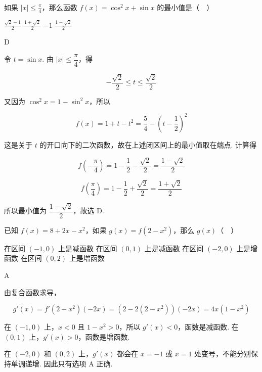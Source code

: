 \begin{problem}
如果 \(|x| \leqslant \frac{\pi}{4}\)，那么函数 \(f(x) = \cos^2 x + \sin x\) 的最小值是（\(\quad\)）

\choices
    {\(\frac{\sqrt{2} - 1}{2}\)}
    {\(\frac{1 + \sqrt{2}}{2}\)}
    {\(-1\)}
    {\(\frac{1 - \sqrt{2}}{2}\)}
\end{problem}

\begin{answer}
D
\end{answer}

\begin{solution}
令 \(t=\sin x\). 由 \(|x|\leqslant\dfrac\pi4\)，得

\[-\frac{\sqrt2}{2}\leqslant t\leqslant\frac{\sqrt2}{2}\]

又因为 \(\cos^2x=1-\sin^2x\)，所以

\[f(x)=1+t-t^2=\frac54-\left(t-\frac12\right)^2\]

这是关于 \(t\) 的开口向下的二次函数，故在上述闭区间上的最小值取在端点. 计算得

\[f\left(-\frac\pi4\right)=1-\frac12-\frac{\sqrt2}{2}=\frac{1-\sqrt2}{2}\]

\[f\left(\frac\pi4\right)=1-\frac12+\frac{\sqrt2}{2}=\frac{1+\sqrt2}{2}\]

所以最小值为 \(\dfrac{1-\sqrt2}{2}\)，故选 D.
\end{solution}

\begin{problem}
已知 \(f(x) = 8 + 2x - x^2\)，如果 \(g(x) = f(2 - x^2)\)，那么 \(g(x)\)（\(\quad\)）

\choices
    {在区间 \((-1,0)\) 上是减函数}
    {在区间 \((0,1)\) 上是减函数}
    {在区间 \((-2,0)\) 上是增函数}
    {在区间 \((0,2)\) 上是增函数}
\end{problem}

\begin{answer}
A
\end{answer}

\begin{solution}
由复合函数求导，

\[g'(x)=f'(2-x^2)(-2x)=\left(2-2(2-x^2)\right)(-2x)=4x(1-x^2)\]

在 \((-1,0)\) 上，\(x<0\) 且 \(1-x^2>0\)，所以 \(g'(x)<0\)，函数是减函数. 在 \((0,1)\) 上，\(g'(x)>0\)，函数是增函数.

在 \((-2,0)\) 和 \((0,2)\) 上，\(g'(x)\) 都会在 \(x=-1\) 或 \(x=1\) 处变号，不能分别保持单调递增. 因此只有选项 A 正确.
\end{solution}

